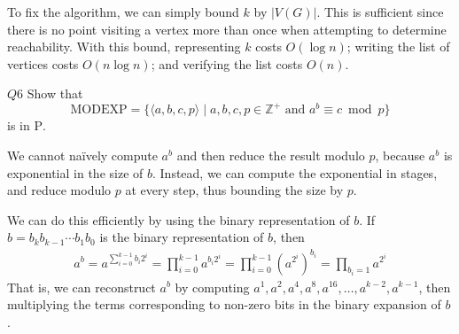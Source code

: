\documentclass{article}
\theoremstyle{definition}
\theoremstyle{definition}
\theoremstyle{remark}
\begin{document}
To fix the algorithm, we can simply bound $k$ by $|V(G)|$. This is sufficient since there is no point visiting a vertex more than once when attempting to determine reachability. With this bound, representing $k$ costs $O(\log{n})$; writing the list of vertices costs $O(n\log{n})$; and verifying the list costs $O(n)$.




\begin{questionbox}{$Q6$}
    Show that
    \begin{equation*}
        \text{MODEXP}=\bigl\{\langle a,b,c,p\rangle\mid a,b,c,p\in\mathbb{Z}^+\text{ and }a^b\equiv c\bmod p\bigr\}
    \end{equation*}
    is in $\mathrm{P}$.
\end{questionbox}

\bigskip

We cannot naïvely compute $a^b$ and then reduce the result modulo $p$, because $a^b$ is exponential in the size of $b$. Instead, we can compute the exponential in stages, and reduce modulo $p$ at every step, thus bounding the size by $p$.

We can do this efficiently by using the binary representation of $b$. If $b=b_kb_{k-1}\cdots b_1b_0$ is the binary representation of $b$, then
\begin{align*}
    a^b=a^{\sum_{i=0}^{k-1}b_i2^i}=\prod_{i=0}^{k-1}a^{b_i2^i}=\prod_{i=0}^{k-1}(a^{2^i})^{b_i}=\prod_{b_i=1}a^{2^i}
\end{align*}
That is, we can reconstruct $a^b$ by computing $a^1,a^2,a^4,a^8,a^{16},\ldots,a^{k-2},a^{k-1}$, then multiplying the terms corresponding to non-zero bits in the binary expansion of $b$.


\end{document}
